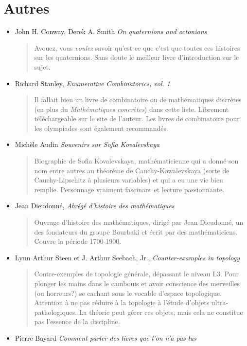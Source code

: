 \documentclass{article}
\begin{document}
\section{Autres}


\begin{itemize}
\item John H. Conway, Derek A. Smith \emph{On quaternions and octonions}
\begin{quote}
Avouez, vous \emph{voulez} savoir qu'est-ce que c'est que toutes ces histoires sur les quaternions. Sans doute le meilleur livre d'introduction sur le sujet.
\end{quote}
\item Richard Stanley, \emph{Enumerative Combinatorics, vol. 1}
\begin{quote}
Il fallait bien un livre de combinatoire ou de mathématiques discrètes (en plus du \emph{Mathématiques concrètes}) dans cette liste. Librement téléchargeable sur le site de l'auteur. Les livres de combinatoire pour les olympiades sont également recommandés.
\end{quote}
\item Michèle Audin \emph{Souvenirs sur Sofia Kovalevskaya}
\begin{quote}
Biographie de Sofia Kovalevskaya, mathématicienne qui a donné son nom entre autres au théorème de Cauchy-Kowalevskaya (sorte de Cauchy-Lipschitz à plusieurs variables) et qui a eu une vie bien remplie. Personnage vraiment fascinant et lecture passionnante.
\end{quote}
\item Jean Dieudonné, \emph{Abrégé d'histoire des mathématiques}
\begin{quote}
Ouvrage d'histoire des mathématiques, dirigé par Jean Dieudonné, un des fondateurs du groupe Bourbaki et écrit par des mathématiciens. Couvre la période 1700-1900. 
\end{quote}
\item Lynn Arthur Steen et J. Arthur Seebach, Jr., \emph{Counter-examples in topology}
\begin{quote}
Contre-exemples de topologie générale, dépassant le niveau L3. Pour plonger les mains dans le cambouis et avoir conscience des  merveilles (ou horreurs?) se cachant sous le vocable d'\og espace topologique\fg. Attention à ne pas réduire à la topologie à l'étude d'objets ultra-pathologiques. La théorie peut gérer ces objets, mais cela ne constitue pas l'essence de la discipline.
\end{quote}
\item Pierre Bayard \emph{Comment parler des livres que l'on n'a pas lus}
\end{itemize}

\end{document}
